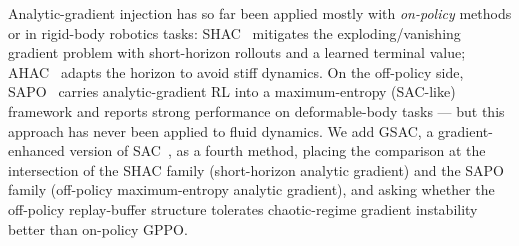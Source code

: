 Analytic-gradient injection has so far been applied mostly with
\emph{on-policy} methods or in rigid-body robotics tasks: SHAC~\cite{shac2022}
mitigates the exploding/vanishing gradient problem with short-horizon
rollouts and a learned terminal value; AHAC~\cite{ahac2024} adapts the
horizon to avoid stiff dynamics. On the off-policy side, SAPO~\cite{sapo2025}
carries analytic-gradient RL into a maximum-entropy (SAC-like) framework and
reports strong performance on deformable-body tasks --- but this approach has
never been applied to fluid dynamics. We add GSAC, a
gradient-enhanced version of SAC~\cite{sac2018}, as a fourth method, placing
the comparison at the intersection of the SHAC family (short-horizon analytic
gradient) and the SAPO family (off-policy maximum-entropy analytic gradient),
and asking whether the off-policy replay-buffer structure tolerates
chaotic-regime gradient instability better than on-policy GPPO.

